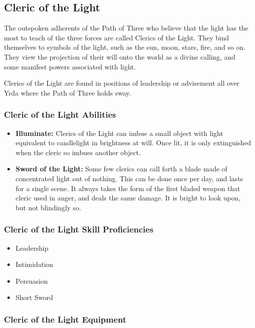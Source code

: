 \begin{multicols}{2}
\subsection{Cleric of the Light}

The outspoken adherents of the Path of Three who believe that the
light has the most to teach of the three forces are called Clerics
of the Light. They bind themselves to symbols of the light, such as
the sun, moon, stars, fire, and so on. They view the projection of
their will onto the world as a divine calling, and some manifest
powers associated with light.

Clerics of the Light are found in positions of leadership or advisement
all over Yrda where the Path of Three holds sway.

\subsubsection{Cleric of the Light Abilities}

\begin{itemize}
  \item \textbf{Illuminate:} Clerics of the Light can imbue a small object
    with light equivalent to candlelight in brightness at will. Once lit,
    it is only extinguished when the cleric so imbues another object.
  \item \textbf{Sword of the Light:} Some few clerics can call forth a
    blade made of concentrated light out of nothing. This can be done once
    per day, and lasts for a single scene. It always takes the form of the
    first bladed weapon that cleric used in anger, and deals the same damage.
    It is bright to look upon, but not blindingly so.
\end{itemize}

\subsubsection{Cleric of the Light Skill Proficiencies}

\begin{itemize}
  \item Leadership
  \item Intimidation
  \item Persuasion
  \item Short Sword
\end{itemize}

\subsubsection{Cleric of the Light Equipment}


\end{multicols}
